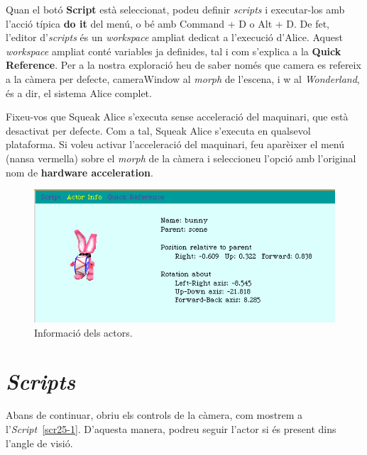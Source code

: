 Quan el botó \textbf{Script} està seleccionat, podeu definir \emph{scripts} i executar-los amb l'acció típica \textbf{do it} del menú, o bé amb \textsf{Command + D} o \textsf{Alt + D}. De fet, l'editor d'\emph{scripts} és un \emph{workspace} ampliat dedicat a l'execució d'Alice. Aquest \emph{workspace} ampliat conté variables ja definides, tal i com s'explica a la \textbf{Quick Reference}. Per a la nostra exploració heu de saber només que \textsf{camera} es refereix a la càmera per defecte, \textsf{cameraWindow} al \emph{morph} de l'escena, i \textsf{w} al \emph{Wonderland}, és a dir, el sistema Alice complet.

Fixeu-vos que Squeak Alice s'executa sense acceleració del maquinari, que està desactivat per defecte. Com a tal, Squeak Alice s'executa en qualsevol plataforma. Si voleu activar l'acceleració del maquinari, feu aparèixer el menú (nansa vermella) sobre el \emph{morph} de la càmera i seleccioneu l'opció amb l'original nom de \textbf{hardware acceleration}.
\begin{figure}[h!]
\begin{center}
\includegraphics[scale=0.5]{Imatges/figura25-7}
\end{center}
\caption{Informació dels actors.}
\label{fig2507}
\end{figure}

\section{\emph{Scripts}}
Abans de continuar, obriu els controls de la càmera, com mostrem a l'\emph{Script}~\ref{scr25-1}. D'aquesta manera, podreu seguir l'actor si és present dins l'angle de visió.
\newpage
{}


